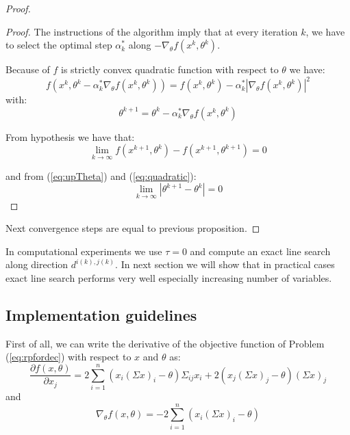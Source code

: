 \begin{proof}
\begin{proof}
The instructions of the algorithm imply that at every iteration $k$, we have to select the optimal step $\alpha_k^*$ along $-\nabla_{\theta}f(x^{k},\theta^{k})$.

Because of $f$ is strictly convex quadratic function with respect to $\theta$ we have:
\begin{equation}\label{eq:quadratic}
f(x^{k},\theta^k-\alpha^*_k\nabla_{\theta}f(x^{k},\theta^{k})) = f(x^{k},\theta^{k})-\alpha^*_k |\nabla_{\theta}f(x^{k},\theta^{k})|^2
\end{equation}
with:
\begin{equation}\label{eq:upTheta}
 \theta^{k+1}= \theta^{k}-\alpha^*_k\nabla_{\theta}f(x^{k},\theta^{k})
\end{equation}

From hypothesis we have that:
\begin{equation}
 \lim_{k \to \infty} f(x^{k+1},\theta^k)-f(x^{k+1},\theta^{k+1})=0
 \end{equation}

and from (\ref{eq:upTheta}) and (\ref{eq:quadratic}):
\begin{equation}
  \lim_{k\to \infty} |\theta^{k+1} -\theta^k| = 0 
\end{equation}
\end{proof}
 
Next convergence steps are equal to previous proposition.
\end{proof}

\begin{oss}
In computational experiments we use $\tau = 0$ and compute an exact line search along direction $d^{i(k),j(k)}$. In next section we will show that in practical cases exact line search performs very well especially increasing number of variables.
\end{oss}

\subsection{Implementation guidelines}
First of all, we can write the derivative of the objective function of Problem (\ref{eq:rpfordec}) with respect to $x$ and $\theta$ as:
\begin{equation}\label{eq:gradxdec}
\frac{\partial f(x,\theta)}{\partial x_j} = 2 \sum_{i=1}^n \left(x_i (\Sigma x)_i - \theta\right)\Sigma_{ij}x_i + 2(x_j (\Sigma x)_j - \theta)(\Sigma x)_j
\end{equation}
and
\begin{equation}\label{eq:gradthetadec}
\nabla_{\theta} f(x,\theta)= -2\sum_{i=1}^n \left(x_i (\Sigma x)_i - \theta\right)
\end{equation}
